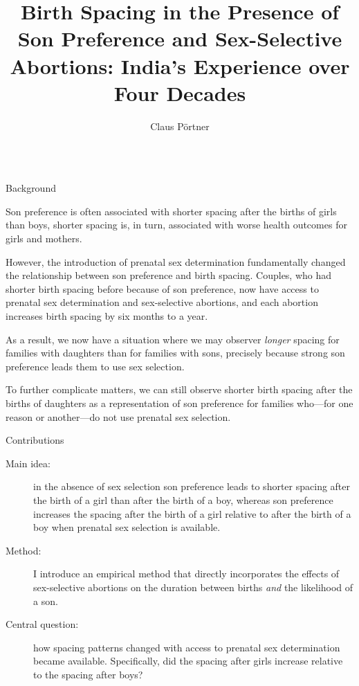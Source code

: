 \documentclass[final]{beamer}
\title{Birth Spacing in the Presence of Son Preference and Sex-Selective \\ Abortions: India's Experience over Four Decades}
\author{Claus P\"ortner}
\institute{Albers School of Business and Economics, Seattle University, \& Center for Studies in Demography and Ecology, University of Washington}
\newlength{\onecolwid}
\begin{document}
\begin{frame}{}
\begin{columns}[t]



\begin{column}{\onecolwid}


\begin{block}{Background}

Son preference is often associated with shorter spacing after the 
births of girls than boys, shorter spacing is, in turn, associated 
with worse health outcomes for girls and mothers.

However, the introduction of prenatal sex determination fundamentally changed the 
relationship between son preference and birth spacing.
Couples, who had shorter birth spacing before because of son preference,
now have access to prenatal sex determination and sex-selective abortions,
and each abortion increases birth spacing by six months to a year.

As a result, we now have a situation where we may observer \emph{longer} spacing
for families with daughters than for families with sons, precisely because
strong son preference leads them to use sex selection.

To further complicate matters, we can still observe shorter birth spacing 
after the births of daughters as a representation of son preference for 
families who---for one reason or another---do not use prenatal sex selection.


\end{block}

\begin{alertblock}{Contributions}

\begin{description}

\item[Main idea:]  in the absence of sex selection son preference leads to shorter 
spacing after the birth of a girl than after the birth of a boy, whereas 
son preference increases the spacing after the birth of a girl relative 
to after the birth of a boy when prenatal sex selection is available.

\item[Method:] I introduce an empirical method that directly incorporates 
the effects of sex-selective abortions on 
the duration between births
\emph{and} 
the likelihood of a son. 

\item[Central question:] how spacing patterns changed with access
to prenatal sex determination became available.
Specifically, did the spacing after girls increase relative to the spacing
after boys?
\end{description}


\end{alertblock}
\end{column}
\end{columns}
\end{frame}
\end{document}
